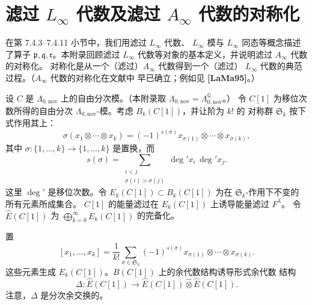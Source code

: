 
\chapter{滤过 $L_\infty$ 代数及滤过 $A_\infty$ 代数的对称化}
\label{app:a3}

在第 7.4.3--7.4.11 小节中，我们用滤过 $L_\infty$ 代数、
$L_\infty$ 模与 $L_\infty$ 同态等概念描述了算子
$\mathfrak p,\mathfrak q,\mathfrak r$。本附录回顾滤过 $L_\infty$
代数等对象的基本定义，并说明滤过 $A_\infty$ 代数的对称化。
对称化是从一个（滤过）$A_\infty$ 代数得到一个（滤过）
$L_\infty$ 代数的典范过程。（$A_\infty$ 代数的对称化在文献中
早已确立；例如见 \textbf{[LaMa95]}。）

设 $C$ 是 $\Lambda_{0,\mathrm{nov}}$ 上的自由分次模。（本附录取
$\Lambda_{0,\mathrm{nov}}=\Lambda^{\mathbb Q}_{0,\mathrm{nov}}$。）
令 $C[1]$ 为移位次数所得的自由分次
$\Lambda_{0,\mathrm{nov}}$-模。考虑 $B_k(C[1])$，并让阶为 $k!$ 的
对称群 $\mathfrak S_k$ 按下式作用其上：
\[
 \sigma(x_1\otimes\cdots\otimes x_k)
 =(-1)^{s(\sigma)}
 x_{\sigma(1)}\otimes\cdots\otimes x_{\sigma(k)},
\]
其中 $\sigma\colon\{1,\ldots,k\}\to\{1,\ldots,k\}$ 是置换，而
\begin{equation}
 s(\sigma)
 =\sum_{\substack{i<j\\\sigma(i)>\sigma(j)}}
 \deg' x_i\,\deg' x_j.
 \tag{A3.1}\label{eq:a3-1}
\end{equation}
这里 $\deg'$ 是移位次数。令
$E_k(C[1])\subset B_k(C[1])$ 为在 $\mathfrak S_k$-作用下不变的
所有元素所成集合。%
$C[1]$ 的能量滤过在 $E_k(C[1])$ 上诱导能量滤过 $F^\lambda$。
令 $\widehat E(C[1])$ 为
$\bigoplus_{k=0}^{\infty}E_k(C[1])$ 的完备化。

置
\[
 [x_1,\ldots,x_k]
 =\frac1{k!}\sum_{\sigma\in\mathfrak S_k}
 (-1)^{s(\sigma)}
 x_{\sigma(1)}\otimes\cdots\otimes x_{\sigma(k)}.
\]
这些元素生成 $E_k(C[1])$。$B(C[1])$ 上的余代数结构诱导形式余代数
结构
\[
 \Delta\colon\widehat E(C[1])
 \longrightarrow
 \widehat E(C[1])\widehat\otimes\widehat E(C[1]).
\]
注意，$\Delta$ 是分次余交换的。

